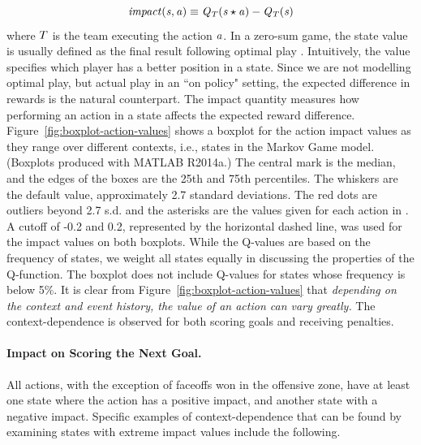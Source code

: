 \documentclass[]{article}
\begin{document}
\begin{equation*}
\it{impact}(s,a) \equiv Q_{T}(s \star a) - Q_{T}(s)
\end{equation*}
where $T$ is the team executing the action $a$. In a zero-sum game, the state value is usually defined as the final result following optimal play \citep{Russell2010}. Intuitively, the value specifies which player has a better position in a state. Since we are not modelling optimal play, but actual play in an ``on policy" setting, the expected difference in rewards is the natural counterpart. The impact quantity measures how performing an action in a state affects the expected reward difference.
Figure~\ref{fig:boxplot-action-values} shows a boxplot for the action impact values as they range over different contexts, i.e., states in the Markov Game model.
(Boxplots produced with MATLAB R2014a.)
The central mark is the median, and the edges of the boxes are the 25th and 75th percentiles.
The whiskers are the default value, approximately 2.7 standard deviations.
The red dots are outliers beyond 2.7 s.d. and the asterisks are the values given for each action in \citep{Lock2009}.
A cutoff of -0.2 and 0.2, represented by the horizontal dashed line, was used for the impact values on both boxplots.
While the Q-values are based on the frequency of states, we weight all states equally in discussing the properties of the Q-function. The boxplot does not include Q-values for states whose frequency is below 5\%.
It is clear from Figure~\ref{fig:boxplot-action-values} that {\em depending on the context and event history, the value of an action can vary greatly.} The context-dependence is observed for both scoring goals and receiving penalties.

\paragraph{Impact on Scoring the Next Goal.} All actions, with the exception of faceoffs won in the offensive zone, have at least one state where the action has a positive impact, and another state with a negative impact. Specific examples of context-dependence that can be found by examining states with extreme impact values include the following.
\end{document}
